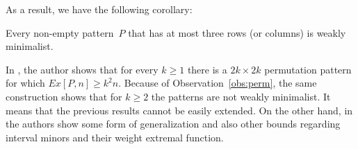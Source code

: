 As a result, we have the following corollary:

\begin{cor}
Every non-empty pattern~$P$ that has at most three rows (or columns) is weakly minimalist.
\end{cor}

In \cite{cibulka09}, the author shows that for every $k\geq1$ there is a $2k\times2k$ permutation pattern for which $Ex[P,n]\geq k^2n$. Because of Observation~\ref{obs:perm}, the same construction shows that for $k\geq2$ the patterns are not weakly minimalist. It means that the previous results cannot be easily extended. On the other hand, in \cite{multipartite} the authors show some form of generalization and also other bounds regarding interval minors and their weight extremal function.